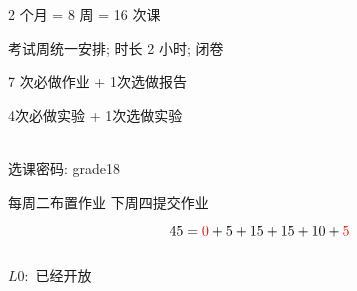 
\begin{frame}{}
  \begin{center}
    {\large 2 个月 = 8 周 = 16 次课}
  \end{center}

\end{frame}

\begin{frame}{}
  \begin{center}
     考试周统一安排; 时长 2 小时; 闭卷
    \vspace{1.00cm}

     7 次必做作业 + 1次选做报告 

    \vspace{1.00cm}
     4次必做实验 + 1次选做实验 
  \end{center}
\end{frame}

\begin{frame}{}
  \begin{center}
     \\[10pt]
    选课密码: grade18

    \vspace{1.50cm}
    每周二布置作业 \qquad 下周四提交作业
  \end{center}
\end{frame}

\begin{frame}{}
  \[
    45 = \textcolor{red}{0} + 5 + 15 + 15 + 10 + \textcolor{red}{5}
  \]

  \vspace{0.30cm}
  \begin{center}
  \end{center}

  \begin{columns}
      \begin{center}
        $L0:$ 已经开放
      \end{center}

  \end{columns}
\end{frame}

